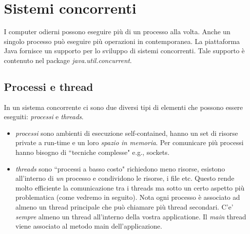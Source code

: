 \documentclass{article}
\begin{document}
\maketitle



\newpage
\tableofcontents
\newpage



\section{Sistemi concorrenti}
I computer odierni possono eseguire pi\`u di un processo alla volta.  Anche un singolo processo pu\`o eseguire pi\`u operazioni in contemporanea. La piattaforma Java fornisce un supporto per lo sviluppo di sistemi concorrenti. Tale supporto \`e contenuto nel package \emph{java.util.concurrent}.

\subsection{Processi e thread}
In un sistema concorrente ci sono due diversi tipi di elementi che possono essere eseguiti: \emph{processi} e \emph{threads}. 
\begin{itemize}
\item \emph{processi} sono ambienti di esecuzione self-contained, hanno un set di risorse private a run-time e un loro \emph{spazio in memoria}. Per comunicare pi\`u processi hanno bisogno di ``tecniche complesse" e.g., sockets.
\item \emph{threads} sono ``processi a basso costo" richiedono meno risorse, esistono all'interno di \emph{un} processo e condividono le risorse, i file etc. Questo rende molto efficiente la comunicazione tra i threads ma sotto un certo aspetto pi\`u problematica (come vedremo in seguito). Nota ogni processo \`e associato ad almeno un thread principale che pu\`o chiamare pi\`u thread secondari. C'e' \emph{sempre} almeno un thread all'interno della vostra applicatione. Il \emph{main} thread viene associato al metodo main dell'applicazione. 
\end{itemize}
\end{document}
